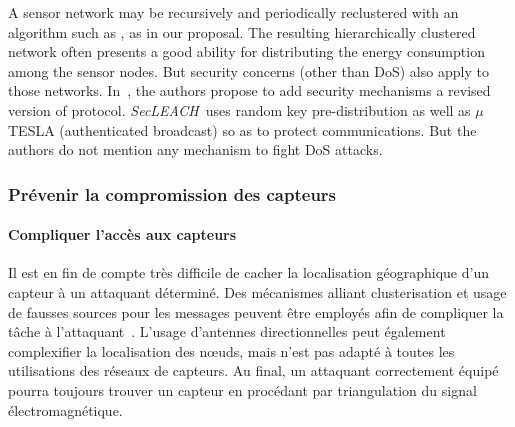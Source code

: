 
A sensor network may be recursively and periodically reclustered with an algorithm such as \leach, as in our proposal.
The resulting hierarchically clustered network often presents a good ability for distributing the energy consumption among the sensor nodes.
But security concerns (other than DoS) also apply to those networks.
In~\cite{OFVWBDL07}, the authors propose to add security mechanisms \via a revised version of \leach protocol.
\textit{SecLEACH}\ uses random key pre-distribution as well as $\mu$TESLA (authenticated broadcast) so as to protect communications.
But the authors do not mention any mechanism to fight DoS attacks.


    \subsubsection{Prévenir la compromission des capteurs}
        \paragraph{Compliquer l'accès aux capteurs}
Il est en fin de compte très difficile de cacher la localisation géographique d'un capteur à un attaquant déterminé.
Des mécanismes alliant clusterisation et usage de fausses sources pour les messages peuvent être employés afin de compliquer la tâche à l'attaquant~\cite{GK13}.
L'usage d'antennes directionnelles peut également complexifier la localisation des nœuds, mais n'est pas adapté à toutes les utilisations des réseaux de capteurs.
Au final, un attaquant correctement équipé pourra toujours trouver un capteur en procédant par triangulation du signal électromagnétique.

